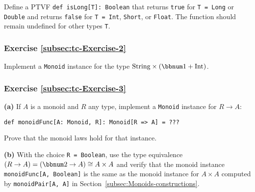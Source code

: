 Define a PTVF \lstinline!def isLong[T]: Boolean! that returns \lstinline!true!
for \lstinline!T = Long! or \lstinline!Double! and returns \lstinline!false!
for \lstinline!T = Int!, \lstinline!Short!, or \lstinline!Float!.
The function should remain undefined for other types \lstinline!T!.

\subsubsection{Exercise \label{subsec:tc-Exercise-2}\ref{subsec:tc-Exercise-2}}

Implement a \lstinline!Monoid! instance for the type $\text{String}\times(\bbnum 1+\text{Int})$.

\subsubsection{Exercise \label{subsec:tc-Exercise-3}\ref{subsec:tc-Exercise-3}}

\textbf{(a)} If $A$ is a monoid and $R$ any type, implement a \lstinline!Monoid!
instance for $R\rightarrow A$:
\begin{lstlisting}
def monoidFunc[A: Monoid, R]: Monoid[R => A] = ???
\end{lstlisting}
Prove that the monoid laws hold for that instance.

\textbf{(b)} With the choice \lstinline!R = Boolean!, use the type
equivalence $(R\rightarrow A)=(\bbnum 2\rightarrow A)\cong A\times A$
and verify that the monoid instance \lstinline!monoidFunc[A, Boolean]!
is the same as the monoid instance for $A\times A$ computed by \lstinline!monoidPair[A, A]!
in Section~\ref{subsec:Monoids-constructions}.%
\begin{comment}
Solution for (a):
\begin{lstlisting}
def monoidFunc[A: Monoid, R] = Monoid[R => A](
  { (x, y) => r => x(r) |+| y(r) }, _ => implicitly[Monoid[A]].empty
)
\end{lstlisting}

In the code notation:
\[
f^{:R\rightarrow A}\oplus g^{:R\rightarrow A}\triangleq a\rightarrow f(a)\oplus_{A}g(a)\quad,\quad\quad e\triangleq(\_\rightarrow e_{A})\quad.
\]
Proof of monoid laws:
\begin{align*}
 & a\triangleright\left(\left(f\oplus g\right)\oplus h\right)=\left(a\triangleright(f\oplus g)\right)\oplus_{A}h(a)=f(a)\oplus_{A}g(a)\oplus_{A}h(a)\quad.\\
 & a\triangleright\left(f\oplus\left(g\oplus h\right)\right)=f(a)\oplus_{A}\left(a\triangleright(g\oplus h)\right)=f(a)\oplus_{A}g(a)\oplus_{A}h(a)\quad.\\
 & a\triangleright\left(e\oplus f\right)=e(a)\oplus_{A}f(a)=e_{A}\oplus_{A}f(a)=f(a)=a\triangleright f\quad.\\
 & a\triangleright(f\oplus e)=f(a)\oplus_{A}e(a)=f(a)\oplus_{A}e_{A}=f(a)=a\triangleright f\quad.
\end{align*}
\end{comment}


